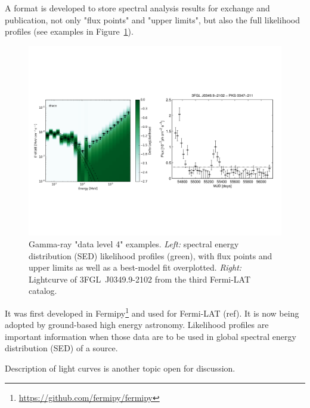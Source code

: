 A format is developed to store spectral analysis results for exchange and publication, not only "flux points" and "upper limits", but also the full likelihood profiles (see examples in Figure~\ref{fig:dl4-examples}).

\begin{figure}[tb]
\centerline{\includegraphics[width=\textwidth]{figures/dl4-examples}}
\caption{
Gamma-ray "data level 4" examples. \emph{Left:} spectral energy distribution (SED) likelihood profiles (green), with flux points and upper limits as well
as a best-model fit overplotted. \emph{Right:} Lightcurve of 3FGL~J0349.9-2102 from the third Fermi-LAT catalog.
}
\label{fig:dl4-examples}
\end{figure}

It was first developed in Fermipy\footnote{\url{https://github.com/fermipy/fermipy}} and used for Fermi-LAT (ref). It is now being adopted by ground-based high energy astronomy. Likelihood profiles are important information when those data are to be used in global spectral energy distribution (SED) of a source. 

Description of light curves is another topic open for discussion. 
